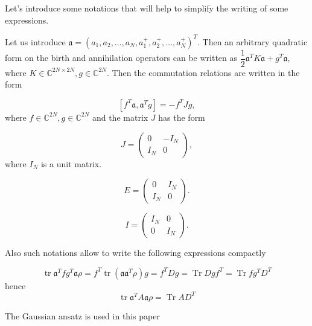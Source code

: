 \documentclass[12pt]{article}
\theoremstyle{definition}
\newcommand\Tr{\operatorname{Tr}}
\newcommand{\mf}[1]{\mathfrak{#1}}
\begin{document}
	Let's introduce some notations that will help to simplify the writing of some expressions.
	
	Let us introduce $\mf{a} = (a_1, a_2, \ldots, a_N, a_1^+, a_2^+,\ldots,a_N^+)^T$. Then an arbitrary quadratic form on the birth and annihilation operators can be written as $\dfrac{1}{2}\mf{a}^TK\mf{a} + g^T\mf{a}$, where $K \in \mathbb{C}^{2N \times 2N}, g \in \mathbb{C}^{2N}$. Then the commutation relations are written in the form 
	
	\begin{equation}
		\label{eq:ComRel}
		[f^T\mf{a},\mf{a}^Tg] = -f^TJg,
	\end{equation}
	where $f \in \mathbb{C}^{2N}, g \in \mathbb{C}^{2N}$ and the matrix $J$ has the form
	
	\begin{equation*}
		J = \begin{pmatrix}
			0 & -I_N \\
			I_N & 0
		\end{pmatrix},
	\end{equation*}
	where $I_N$ is a unit matrix.
	
	\begin{equation*}
		E = \begin{pmatrix}
			0 & I_N \\
			I_N & 0
		\end{pmatrix}.
	\end{equation*}
	
	\begin{equation*}
		I = \begin{pmatrix}
			I_N & 0 \\
			0 & I_N
		\end{pmatrix}.
	\end{equation*}
	
	Also such notations allow to write the following expressions compactly
	
	\begin{equation*}
		\operatorname{tr} \mathfrak{a}^T f g^T  \mathfrak{a} \rho =   f^T \operatorname{tr}(\mathfrak{a}  \mathfrak{a}^T \rho) g = f^T D g = \Tr D g  f^T  = \Tr f g^T D^T
	\end{equation*}
	hence 
	\begin{equation}
		\label{eq:CompFormOfAv}
		\operatorname{tr} \mathfrak{a}^TA \mathfrak{a} \rho  = \Tr AD^T
	\end{equation}
	
	
	The Gaussian ansatz is used in this paper 
	
\end{document}
